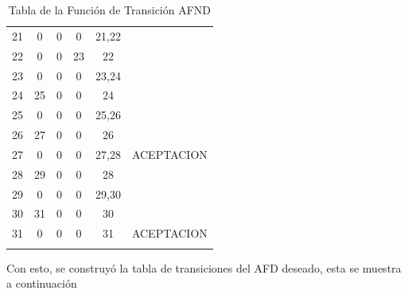 \begin{longtable}{||c||cccc||c||}
21 & 0  & 0  & 0  & 21,22   &             \\
22 & 0  & 0  & 23 & 22      &             \\
23 & 0  & 0  & 0  & 23,24   &             \\
24 & 25 & 0  & 0  & 24      &             \\
25 & 0  & 0  & 0  & 25,26   &             \\
26 & 27 & 0  & 0  & 26      &             \\
27 & 0  & 0  & 0  & 27,28   & ACEPTACION  \\
28 & 29 & 0  & 0  & 28      &             \\
29 & 0  & 0  & 0  & 29,30   &             \\
30 & 31 & 0  & 0  & 30      &             \\
31 & 0  & 0  & 0  & 31      & ACEPTACION  \\
\hline
\hline

\caption{Tabla de la Función de Transición AFND}
\label{AFNDFechas}
\end{longtable}

Con esto, se construyó la tabla de transiciones del AFD deseado, esta se muestra a continuación

